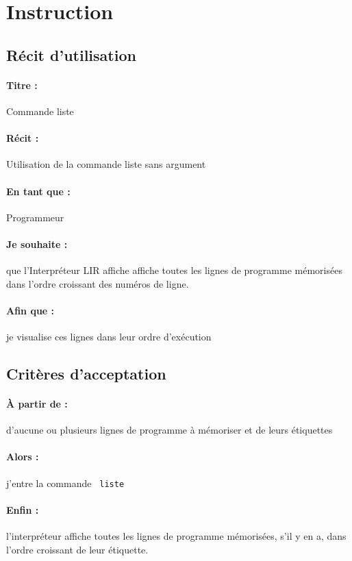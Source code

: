 \section{Instruction}

    \subsection*{Récit d'utilisation}

    \paragraph{Titre : } Commande liste
    \paragraph{Récit : } Utilisation de la commande liste sans argument
    \paragraph{En tant que : } Programmeur
    \paragraph{Je souhaite : } que l'Interpréteur LIR affiche affiche
    toutes les lignes de programme mémorisées dans l'ordre
    croissant des numéros de ligne.
    \paragraph{Afin que : } je visualise ces lignes dans leur ordre
    d'exécution

    \subsection*{Critères d'acceptation}

    \paragraph{À partir de : } d'aucune ou plusieurs lignes de programme
    à mémoriser et de leurs étiquettes

    \paragraph{Alors : } j'entre la commande \verb| liste |

    \paragraph{Enfin : } l'interpréteur affiche toutes les lignes
    de programme mémorisées, s'il y en a, dans l'ordre croissant de leur étiquette.